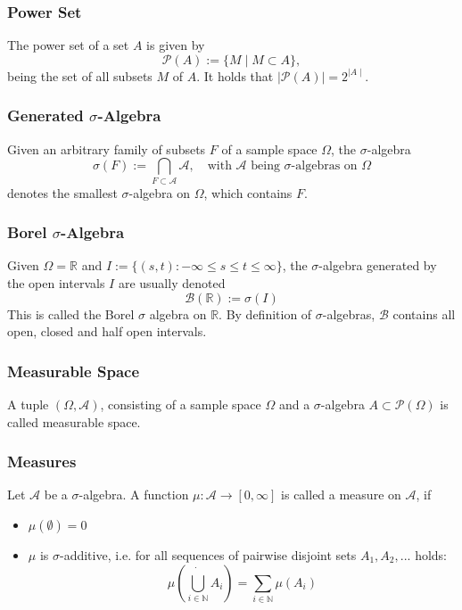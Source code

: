 \documentclass{beamer}
\begin{document}
\begin{frame}
\frametitle{Power Set}

The power set of a set $A$ is given by 
\[
\mathcal{P}(A) := \{M \mid M \subset A\},
\]
being the set of all subsets $M$ of $A$.
It holds that $\mid \mathcal{P}(A)\mid = 2^{ \mid A\mid}$.

\end{frame}


\begin{frame}
\frametitle{Generated $\sigma$-Algebra}

Given an arbitrary family of subsets $F$ of a sample space $\Omega$, the $\sigma$-algebra
\[
\sigma (F) := \bigcap_{F \subset \mathscr{A}} \mathscr{A} , \quad \text{with }\mathscr{A}\text{ being }\sigma \text{-algebras on } \Omega
\]
denotes the smallest $\sigma$-algebra on $\Omega$, which contains $F$.

\end{frame}


\begin{frame}
\frametitle{Borel $\sigma$-Algebra}

Given $\Omega = \mathbb{R}$ and $I:= \{ (s, t): -\infty  \leq s \leq t \leq \infty \}$, the $\sigma$-algebra generated by the open intervals $I$ are usually denoted
\[
\mathscr{B} (\mathbb{R}) := \sigma (I)
\]
This is called the Borel $\sigma$ algebra on $\mathbb{R}$. By definition of $\sigma$-algebras, $\mathscr{B}$ contains all open, closed and half open intervals.

\end{frame}


\begin{frame}
\frametitle{Measurable Space}

A tuple $(\Omega, \mathscr{A})$, consisting of a sample space $\Omega$
 and a $\sigma$-algebra $A \subset \mathcal{P}(\Omega)$ is called measurable space.

\end{frame}


\begin{frame}
\frametitle{Measures}

Let $\mathscr{A}$ be a $\sigma$-algebra. A function $\mu : \mathscr{A} \to [0, \infty]$ is called a measure
on $\mathscr{A}$, if
\begin{itemize}
\pause
\item{$\mu(\emptyset) = 0$}
\pause
\item{$\mu$ is $\sigma$-additive, i.e. for all sequences of pairwise disjoint sets $A_1, A_2, . . .$ holds: \[
\mu\left( \dot{\bigcup\limits_{i \in \mathbb{N}}}A_i \right) = \sum_{i \in \mathbb{N}}\mu(A_i)
\]}
\end{itemize}

\end{frame}
\end{document}
